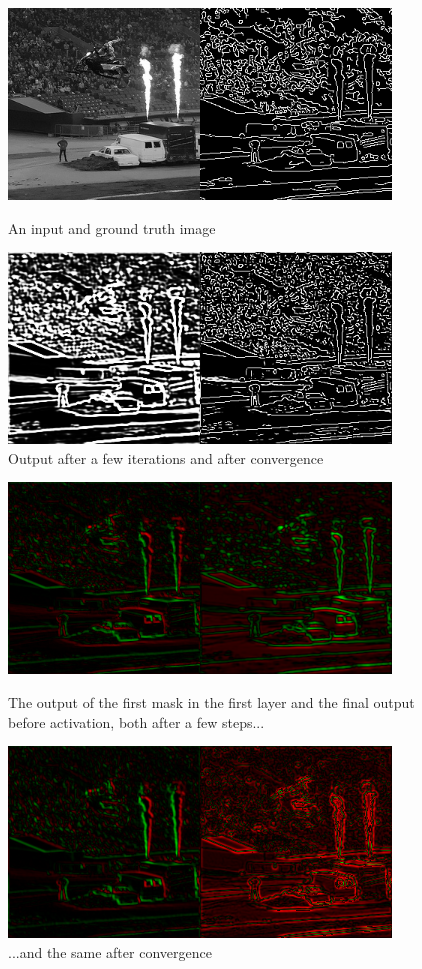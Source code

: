 \documentclass[12pt]{report}
\begin{document}
\begin{figure}
	\centering
	\includegraphics[width=0.8\linewidth]{images/out1.png}
	\caption{An input and ground truth image}
	\includegraphics[width=0.8\linewidth]{images/out2.png}
	\caption{Output after a few iterations and after convergence}
\end{figure}
\begin{figure}
	\centering
	\includegraphics[width=0.8\linewidth]{images/layer1.png}
	\caption{The output of the first mask in the first layer and the final output before activation, both after a few steps...}
	\includegraphics[width=0.8\linewidth]{images/layer2.png}
	\caption{...and the same after convergence}
\end{figure}
\end{document}
